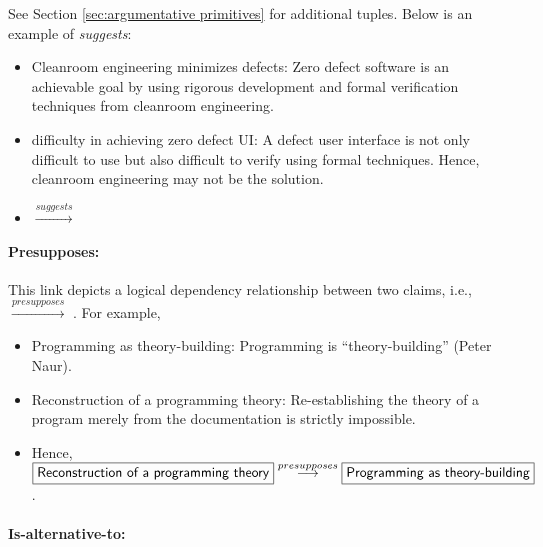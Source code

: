 See Section \ref{sec:argumentative primitives} for additional tuples. Below
is an example of {\it suggests\/}:

\small
\begin{itemize}
\item {\sf Cleanroom engineering minimizes defects}: Zero defect
  software is an achievable goal by using rigorous development and formal
  verification techniques from cleanroom engineering.
  
\item {\sf difficulty in achieving zero defect UI:\/} A defect user
  interface is not only difficult to use but also difficult to verify using
  formal techniques.  Hence, cleanroom engineering may not be the solution.
  
\item {}
\( \stackrel{suggests}{\longrightarrow}\)
\end{itemize}
\normalsize

\paragraph{Presupposes:}

This link depicts a logical dependency relationship between two claims,
i.e.,  \(
\stackrel{presupposes}{\longrightarrow} \) . For
example,

\small
\begin{itemize}
\item {\sf Programming as theory-building:\/} Programming is
  ``theory-building'' (Peter Naur).
  
\item {\sf Reconstruction of a programming theory:} Re-establishing the
  theory of a program merely from the documentation is strictly impossible.
  
\item Hence, \hspace{.01in}\( \fbox{{\sf Reconstruction of a programming
  theory\/}} \stackrel{presupposes}{\longrightarrow} \fbox{{\sf Programming
  as theory-building}} \).
\end{itemize}
\normalsize


\paragraph{Is-alternative-to:}


